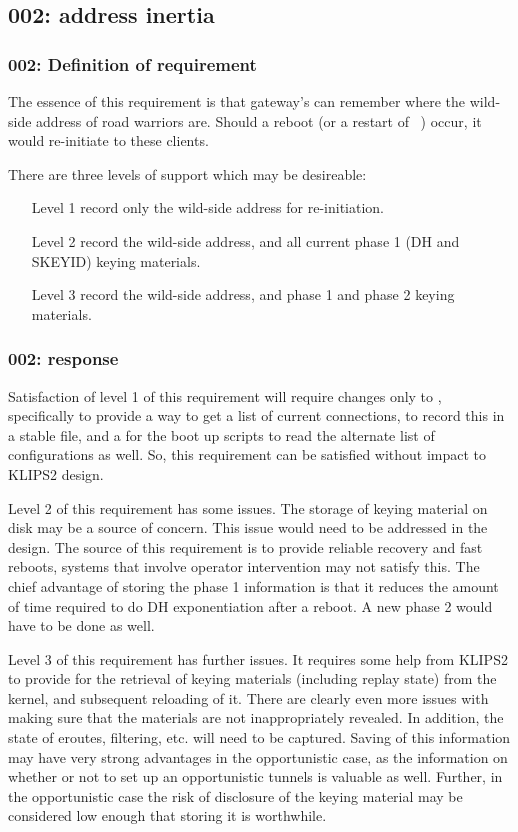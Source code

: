 \subsection{002: address inertia}

\subsubsection{002: Definition of requirement}

The essence of this requirement is that gateway's can remember where the
wild-side address of road warriors are. Should a reboot (or a restart of
\pluto\ ) occur, it would re-initiate to these clients.

There are three levels of support which may be desireable:

\begin{enumerate}
\item[Level 1] 	record only the wild-side address for re-initiation.

\item[Level 2]  record the wild-side address, and all current phase 1 (DH and
			SKEYID) keying materials.

\item[Level 3] 	record the wild-side address, and phase 1 and phase 2 keying materials.
\end{enumerate}

\subsubsection{002: response}

Satisfaction of level 1 of this requirement will require changes only to 
\pluto, specifically to provide a way to get a list of current connections,
to record this in a stable file, and a for the boot up scripts to read the
alternate list of configurations as well. So, this requirement can be
satisfied without impact to KLIPS2 design.

Level 2 of this requirement has some issues. The storage of keying material
on disk may be a source of concern. This issue would need to be addressed
in the design. The source of this requirement is to provide reliable recovery
and fast reboots, systems that involve operator intervention may not satisfy
this. The chief advantage of storing the phase 1 information is that it
reduces the amount of time required to do DH exponentiation after a reboot. 
A new phase 2 would have to be done as well.

Level 3 of this requirement has further issues. It requires some help from
KLIPS2 to provide for the retrieval of keying materials (including replay
state) from the kernel, and subsequent reloading of it. There are clearly
even more issues with making sure that the materials are not inappropriately
revealed. 
In addition, the state of eroutes, filtering, etc. will need to be
captured. Saving of this information may have very strong advantages in the
opportunistic case, as the information on whether or not to set up an
opportunistic tunnels is valuable as well. Further, in the opportunistic
case the risk of disclosure of the keying material may be considered low
enough that storing it is worthwhile.

